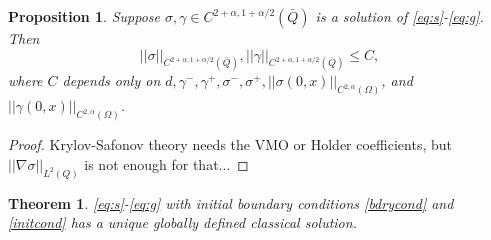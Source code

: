 \documentclass[a4paper,11pt]{article}
\def\red{\color{red}}
\newtheorem{theorem}{Theorem}
\newtheorem{proposition}{Proposition}[section]
\newtheorem{corollary}{Corollary}[section]
\theoremstyle{remark}
\begin{document}
{\red 
\begin{proposition}
Suppose $\sigma,\gamma\in C^{2+\alpha,1+\alpha/2}(\bar{Q})$ is a solution of \eqref{eq:s}-\eqref{eq:g}. Then 
$$ ||\sigma||_{C^{2+\alpha,1+\alpha/2}(\bar{Q})}, ||\gamma||_{C^{2+\alpha,1+\alpha/2}(\bar{Q})} \le C,$$
where $C$ depends only on $d,\gamma^-,\gamma^+, \sigma^-, \sigma^+, ||\sigma(0,x)||_{C^{2,\alpha}(\Omega)}$, and $||\gamma(0,x)||_{C^{2,\alpha}(\Omega)}$.
\end{proposition}
\begin{proof}
Krylov-Safonov theory needs the VMO or Holder coefficients, but $||\nabla\sigma||_{L^2(Q)}$ is not enough for that...
\end{proof}
}

\begin{theorem} \label{thm:existence}
 \eqref{eq:s}-\eqref{eq:g} with initial boundary conditions \eqref{bdrycond} and \eqref{initcond} has a unique globally defined classical solution.
\end{theorem}
 
\end{document}
